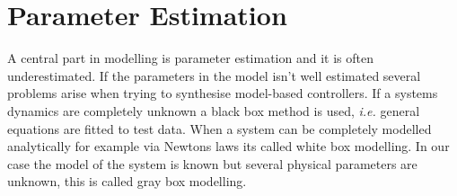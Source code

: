 \chapter{Parameter Estimation} \label{cha:parameterEstimation}
A central part in modelling is parameter estimation and it is often underestimated. If the parameters in the model isn't well estimated several problems arise when trying to synthesise model-based controllers. If a systems dynamics are completely unknown a black box method is used, \textit{i.e.} general equations are fitted to test data. When a system can be completely modelled analytically for example via Newtons laws its called white box modelling. In our case the model of the system is known but several physical parameters are unknown, this is called gray box modelling. 


